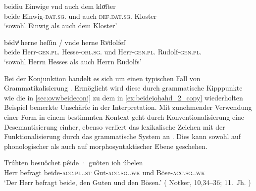 \begin{exe}
\ex \label{ex:caoconjbeide}
	\begin{xlist}
	\ex \label{ex:caoconjbeide_1}
		\gll beidiu Einwige vnd auch dem kloͤſter \\
				beide Einwig-\textsc{dat.sg.\FemF} und auch
					\textsc{def.dat.sg.\NeutM} Kloster \\
		\trans `sowohl Einwig als auch dem Kloster'
			\parencites(Nr.~2925, Landshut, 1298)[219,34]{cao4}

	\ex \label{ex:caoconjbeide_2}
		\gll bédvͥ herne heſſin / vnde herne Rvͦdolfeſ \\
			beide Herr-\textsc{gen.pl.\MascM} Hesse-\textsc{obl.sg.\MascM} {} und
				Herr-\textsc{gen.pl.\MascM} Rudolf-\textsc{gen.pl.\MascM} \\
		\trans `sowohl Herrn Hesses als auch Herrn Rudolfs'
			\parencites(Nr.~1318, Freiburg i.\,Br., 1290)[561,11--12]{cao2}
	\end{xlist}
\end{exe}

Bei der Konjunktion  handelt es sich um einen typischen Fall von
Grammatikalisierung \autocite[vgl.][134--188]{lehmann2015}. Ermöglicht wird
diese durch grammatische Kipppunkte wie die in \cref{sec:ovwbeideconj} zu dem
in \cref{ex:beidejohahd_2_copy} wiederholten Beispiel bemerkte Unschärfe in der
Interpretation. Mit zunehmender Verwendung einer Form in einem bestimmten
Kontext geht durch Konventionalisierung eine Desemantisierung einher, ebenso
verliert das lexikalische Zeichen mit der Funktionalisierung durch das
grammatische System an . Dies kann sowohl auf phonologischer als
auch auf morphosyntaktischer Ebene geschehen.

\begin{exe}
\ex \label{ex:beidejohahd_2_copy}
	\gll Trúhten besuôchet pêide · guôten ioh úbelen \\
			Herr befragt beide-\textsc{acc.pl.\MascA.st} {}
				Gut-\textsc{acc.sg.\MascA.wk} und
				Böse-\textsc{acc.sg.\MascA.wk} \\
		\trans `Der Herr befragt beide, den Guten und den Bösen.'
			(%
				Notker,  10,34--36;
				11.~Jh.%
			)
\end{exe}

